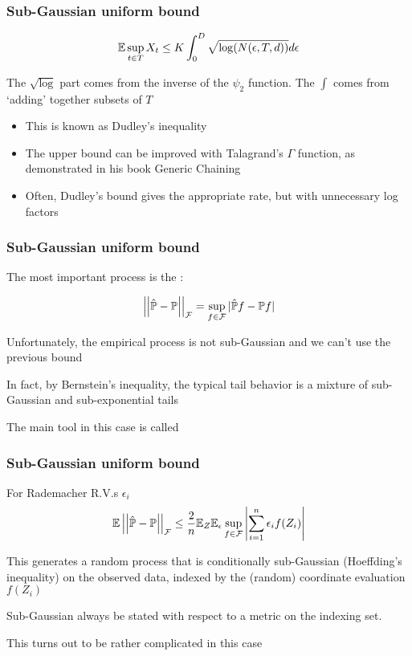 \documentclass[12pt]{beamer}
\begin{document}
\begin{frame}[fragile]
\frametitle{Sub-Gaussian uniform bound}
\[
\mathbb{E} \sup_{t \in T} X_t \leq K\int_0^D \sqrt{\log(N(\epsilon,T,d))} d\epsilon
\]

 The $\sqrt{\log}$ part comes from the inverse of the $\psi_2$ function.  The $\int$ comes
from `adding' together subsets of $T$ 

\vsp
{}
\begin{itemize}
\item This is known as Dudley's inequality
\item The upper bound can be improved with Talagrand's $\Gamma$ function, as demonstrated in his book Generic Chaining
\item Often, Dudley's bound gives the appropriate rate, but with unnecessary log factors
\end{itemize}

\end{frame}
%
%
%




\begin{frame}[fragile]
\frametitle{Sub-Gaussian uniform bound}
The most important process is the :

\[
\left|\left| \hat{\mathbb{P}} - \mathbb{P} \right|\right|_{\mathcal{F}} = \sup_{f \in \mathcal{F}} |\hat{\mathbb{P}} f - \mathbb{P} f|
\]

\vsp
Unfortunately, the empirical process is not sub-Gaussian and we can't use the previous bound

\vsp
In fact, by Bernstein's inequality, the typical tail behavior is a mixture of sub-Gaussian and sub-exponential
tails

\vsp
The main tool in this case is called 

\end{frame}

\begin{frame}[fragile]
\frametitle{Sub-Gaussian uniform bound}
For Rademacher R.V.s $\epsilon_i$
\[
\mathbb{E} \left|\left| \hat{\mathbb{P}} - \mathbb{P} \right|\right|_{\mathcal{F}} \leq \frac{2}{n} \mathbb{E}_Z\mathbb{E}_\epsilon \sup_{f\in \mathcal{F}} \left| \sum_{i=1}^n \epsilon_i f(Z_i) \right|
\]

\vsp
This generates a random process that is conditionally sub-Gaussian (Hoeffding's inequality) on the observed data, indexed by the (random) coordinate evaluation $f(Z_i)$

\vsp
Sub-Gaussian  always be stated with respect to a metric on the indexing set.  

\vsp
This turns out to be rather complicated in this case 
\end{frame}
\end{document}
